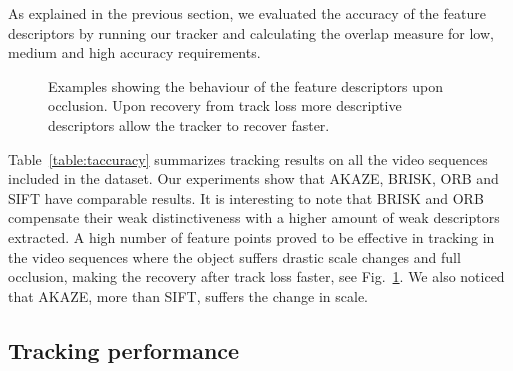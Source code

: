 As explained in the previous section, we evaluated the accuracy of the feature descriptors by running our tracker and calculating the overlap measure for low, medium and high accuracy requirements. 
\begin{figure}[!h]
	\vspace{2mm}
\centerline{%
	}
\caption{Examples showing the behaviour of the feature descriptors upon occlusion. Upon recovery from track loss more descriptive descriptors allow the tracker to recover faster.}
\vspace{-3mm}
\label{fig:tracking_results}
\end{figure}

Table~\ref{table:taccuracy} summarizes tracking results on all the video sequences included in the dataset.  Our experiments show that AKAZE, BRISK, ORB and SIFT have comparable results. It is interesting to note that BRISK and ORB compensate their weak distinctiveness with a higher amount of weak descriptors extracted. A high number of feature points proved to be effective in tracking in the video sequences where the object suffers drastic scale changes and full occlusion, making the recovery after track loss faster, see Fig.~\ref{fig:tracking_results}. We also noticed that AKAZE, more than SIFT, suffers the change in scale. 

\subsection{Tracking performance}

